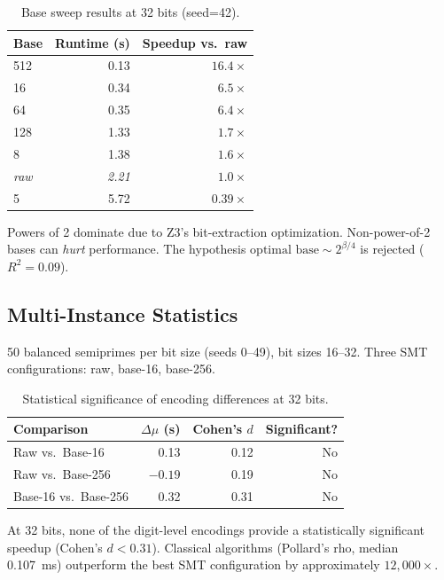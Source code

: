 \documentclass[11pt,a4paper]{article}
\begin{document}
\begin{table}[h]
\centering
\caption{Base sweep results at 32 bits (seed=42).}
\label{tab:basesweep}
\begin{tabular}{@{}lrr@{}}
\toprule
Base & Runtime (s) & Speedup vs.\ raw \\
\midrule
512 & 0.13 & $16.4\times$ \\
16 & 0.34 & $6.5\times$ \\
64 & 0.35 & $6.4\times$ \\
128 & 1.33 & $1.7\times$ \\
8 & 1.38 & $1.6\times$ \\
\emph{raw} & \emph{2.21} & \emph{$1.0\times$} \\
5 & 5.72 & $0.39\times$ \\
\bottomrule
\end{tabular}
\end{table}

Powers of 2 dominate due to Z3's bit-extraction optimization. Non-power-of-2 bases can \emph{hurt} performance. The hypothesis $\text{optimal base} \sim 2^{\beta/4}$ is rejected ($R^2 = 0.09$).

\subsection{Multi-Instance Statistics}

50 balanced semiprimes per bit size (seeds 0--49), bit sizes 16--32. Three SMT configurations: raw, base-16, base-256.

\begin{table}[h]
\centering
\caption{Statistical significance of encoding differences at 32 bits.}
\label{tab:multiinstance}
\begin{tabular}{@{}lrrr@{}}
\toprule
Comparison & $\Delta\mu$ (s) & Cohen's $d$ & Significant? \\
\midrule
Raw vs.\ Base-16 & 0.13 & 0.12 & No \\
Raw vs.\ Base-256 & $-0.19$ & 0.19 & No \\
Base-16 vs.\ Base-256 & 0.32 & 0.31 & No \\
\bottomrule
\end{tabular}
\end{table}

At 32 bits, none of the digit-level encodings provide a statistically significant speedup (Cohen's $d < 0.31$). Classical algorithms (Pollard's rho, median 0.107~ms) outperform the best SMT configuration by approximately $12{,}000\times$.
\end{document}
